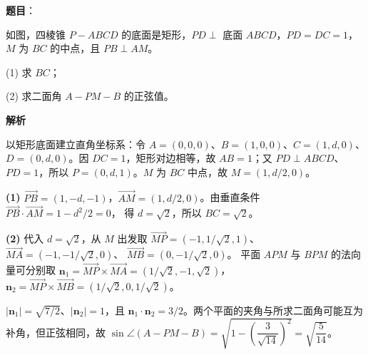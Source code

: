 \begin{answer}

\textbf{题目}：

如图，四棱锥 $P-ABCD$ 的底面是矩形，$PD\perp$ 底面 $ABCD$，$PD=DC=1$，$M$ 为 $BC$ 的中点，且 $PB\perp AM$。
\nopagebreak[4]
\begin{center}\end{center}
\nopagebreak[4]
  (1) 求 $BC$；

  (2) 求二面角 $A-PM-B$ 的正弦值。

\textbf{解析}

以矩形底面建立直角坐标系：令 $A=(0,0,0)$、$B=(1,0,0)$、$C=(1,d,0)$、$D=(0,d,0)$。因 $DC=1$，矩形对边相等，故 $AB=1$；又 $PD\perp ABCD$、$PD=1$，所以 $P=(0,d,1)$。$M$ 为 $BC$ 中点，故 $M=(1,d/2,0)$。

\textbf{(1)} $\overrightarrow{PB}=(1,-d,-1)$，$\overrightarrow{AM}=(1,d/2,0)$。由垂直条件
$\overrightarrow{PB}\cdot\overrightarrow{AM}=1-d^2/2=0$，
得 $d=\sqrt2$，所以 $BC=\sqrt2$。

\textbf{(2)} 代入 $d=\sqrt2$，从 $M$ 出发取
$\overrightarrow{MP}=(-1,1/\sqrt2,1)$、
$\overrightarrow{MA}=(-1,-1/\sqrt2,0)$、
$\overrightarrow{MB}=(0,-1/\sqrt2,0)$。
平面 $APM$ 与 $BPM$ 的法向量可分别取
$\boldsymbol n_1=\overrightarrow{MP}\times\overrightarrow{MA}=(1/\sqrt2,-1,\sqrt2)$，
$\boldsymbol n_2=\overrightarrow{MP}\times\overrightarrow{MB}=(1/\sqrt2,0,1/\sqrt2)$。

$|\boldsymbol n_1|=\sqrt{7/2}$、$|\boldsymbol n_2|=1$，且 $\boldsymbol n_1\cdot\boldsymbol n_2=3/2$。两个平面的夹角与所求二面角可能互为补角，但正弦相同，故
$\sin\angle(A-PM-B)=\sqrt{1-\left(\dfrac{3}{\sqrt{14}}\right)^2}=\sqrt{\dfrac5{14}}$。



\end{answer}
